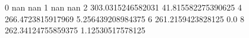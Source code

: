 0 nan nan
1 nan nan
2 303.0315246582031 41.815582275390625
4 266.4723815917969 5.256439208984375
6 261.2159423828125 0.0
8 262.34124755859375 1.12530517578125
